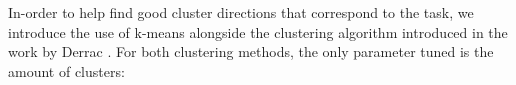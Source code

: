 








In-order to help find good cluster directions that correspond to the task, we introduce the use of k-means alongside the clustering algorithm introduced in the work by Derrac \cite{Derrac2015}. For both clustering methods, the only parameter tuned is the amount of clusters:





